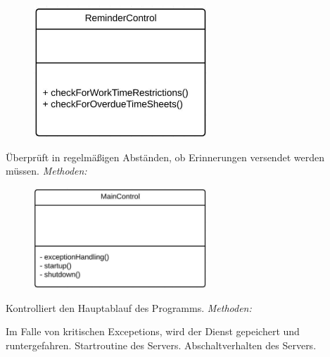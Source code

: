 \begin{itemize}
\begin{itemize}
                    \newpage
                    \begin{figure}[htb]
                    \centering
                    \includegraphics[width=6.5cm]{Diagramms/class/singleclass/ControlRem.pdf}
                    \end{figure}
                    \newline
                        Überprüft in regelmäßigen Abständen, ob Erinnerungen versendet werden müssen.
                        \newline
                        \emph{Methoden:}
                        \begin{itemize}
                        \end{itemize}

                    
                    \begin{figure}[htb]
                    \centering
                    \includegraphics[width=6.5cm]{Diagramms/class/singleclass/ControlMain.pdf}
                    \end{figure}
                    \newline
                        Kontrolliert den Hauptablauf des Programms.
                        \newline
                        \emph{Methoden:}
                        \begin{itemize}
                                Im Falle von kritischen Excepetions, wird der Dienst gepeichert und runtergefahren.
                                Startroutine des Servers.
                                Abschaltverhalten des Servers.
                        \end{itemize}


\end{itemize}
\end{itemize}
